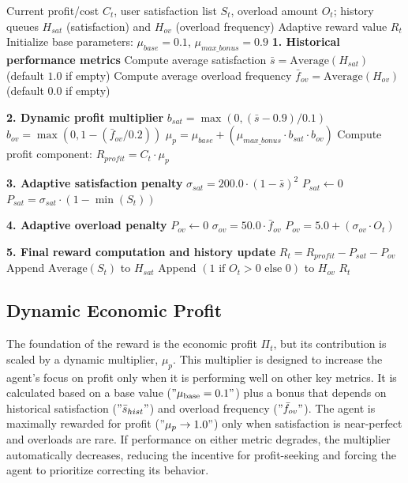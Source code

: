 \begin{algorithm}[H]
\caption{Dynamic \& History-Based Adaptive Reward (\texttt{FastProfitAdaptiveReward})}
\label{alg:adaptive_reward}
{\small
\begin{algorithmic}[1]
\Require Current profit/cost $C_t$, user satisfaction list $S_t$, overload amount $O_t$; 
         history queues $H_{sat}$ (satisfaction) and $H_{ov}$ (overload frequency)
\Ensure Adaptive reward value $R_t$
\State Initialize base parameters: $\mu_{base} = 0.1$, $\mu_{max\_bonus} = 0.9$
    \State \textbf{1. Historical performance metrics}
    \State Compute average satisfaction $\bar{s} = \text{Average}(H_{sat})$ (default $1.0$ if empty)
    \State Compute average overload frequency $\bar{f}_{ov} = \text{Average}(H_{ov})$ (default $0.0$ if empty)

    \State \textbf{2. Dynamic profit multiplier}
    \State $b_{sat} = \max(0, (\bar{s} - 0.9)/0.1)$ 
    \State $b_{ov} = \max(0, 1 - (\bar{f}_{ov}/0.2))$ 
    \State $\mu_p = \mu_{base} + (\mu_{max\_bonus} \cdot b_{sat} \cdot b_{ov})$
    \State Compute profit component: $R_{profit} = C_t \cdot \mu_p$

    \State \textbf{3. Adaptive satisfaction penalty}
    \State $\sigma_{sat} = 200.0 \cdot (1 - \bar{s})^2$ 
    \State $P_{sat} \gets 0$
        \State $P_{sat} = \sigma_{sat} \cdot (1 - \min(S_t))$
    \EndIf

    \State \textbf{4. Adaptive overload penalty}
    \State $P_{ov} \gets 0$
        \State $\sigma_{ov} = 50.0 \cdot \bar{f}_{ov}$ 
        \State $P_{ov} = 5.0 + (\sigma_{ov} \cdot O_t)$
    \EndIf

    \State \textbf{5. Final reward computation and history update}
    \State $R_t = R_{profit} - P_{sat} - P_{ov}$
    \State Append $\text{Average}(S_t)$ to $H_{sat}$
    \State Append $(1 \text{ if } O_t > 0 \text{ else } 0)$ to $H_{ov}$
    \State \Return $R_t$
\EndFunction
\end{algorithmic}
}
\end{algorithm}


\subsection{Dynamic Economic Profit}
The foundation of the reward is the economic profit $\Pi_t$, but its contribution is scaled by a dynamic multiplier, $\mu_p$. This multiplier is designed to increase the agent's focus on profit only when it is performing well on other key metrics. It is calculated based on a base value ($"\mu_{\text{base}} = 0.1"$) plus a bonus that depends on historical satisfaction ($"\bar{s}_{hist}"$) and overload frequency ($"\bar{f}_{ov}"$). The agent is maximally rewarded for profit ($"\mu_p \to 1.0"$) only when satisfaction is near-perfect and overloads are rare. If performance on either metric degrades, the multiplier automatically decreases, reducing the incentive for profit-seeking and forcing the agent to prioritize correcting its behavior.

